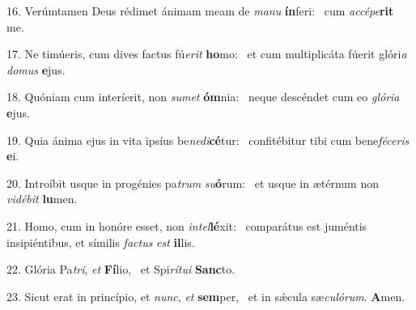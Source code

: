 16. Verúmtamen Deus rédimet ánimam meam de \textit{ma}\textit{nu} \textbf{ín}feri: \ast\  cum \textit{ac}\textit{cé}\textit{pe}\textbf{rit} me.\

17. Ne timúeris, cum dives factus fú\textit{e}\textit{rit} \textbf{ho}mo: \ast\  et cum multiplicáta fúerit glóri\textit{a} \textit{do}\textit{mus} \textbf{e}jus.\

18. Quóniam cum interíerit, non \textit{su}\textit{met} \textbf{óm}nia: \ast\  neque descéndet cum eo \textit{gló}\textit{ri}\textit{a} \textbf{e}jus.\

19. Quia ánima ejus in vita ipsíus be\textit{ne}\textit{di}\textbf{cé}tur: \ast\  confitébitur tibi cum bene\textit{fé}\textit{ce}\textit{ris} \textbf{e}i.\

20. Introíbit usque in progénies pa\textit{trum} \textit{su}\textbf{ó}rum: \ast\  et usque in ætérnum non \textit{vi}\textit{dé}\textit{bit} \textbf{lu}men.\

21. Homo, cum in honóre esset, non \textit{in}\textit{tel}\textbf{lé}xit: \ast\  comparátus est juméntis insipiéntibus, et símilis \textit{fac}\textit{tus} \textit{est} \textbf{il}lis.\

22. Glória Pa\textit{tri}, \textit{et} \textbf{Fí}lio, \ast\  et Spi\textit{rí}\textit{tu}\textit{i} \textbf{Sanc}to.\

23. Sicut erat in princípio, et \textit{nunc}, \textit{et} \textbf{sem}per, \ast\  et in sǽcula sæ\textit{cu}\textit{ló}\textit{rum}. \textbf{A}men.\

